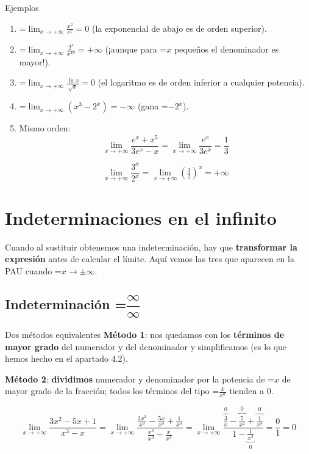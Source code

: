 \documentclass[11pt,a4paper]{article}
\newcommand{\fmm}[1]{\setbox0=\hbox{$#1$}\ifdim\wd0>\linewidth\[#1\]\else\mbox{\box0}\fi}
\begin{document}
  
\begin{fmex}{Ejemplos}
\begin{enumerate}[label=\textbf{\arabic*.},leftmargin=*]
\item \fmm{\displaystyle\lim_{x\to+\infty}\frac{x^2}{e^x}=0} (la exponencial de abajo es de orden superior).
\item \fmm{\displaystyle\lim_{x\to+\infty}\frac{2^x}{x^{10}}=+\infty} (¡aunque para \fmm{x} pequeños el denominador es mayor!).
\item \fmm{\displaystyle\lim_{x\to+\infty}\frac{\ln x}{\sqrt x}=0} (el logaritmo es de orden inferior a cualquier potencia).
\item \fmm{\displaystyle\lim_{x\to+\infty}\left(x^3-2^x\right)=-\infty} (gana \fmm{-2^x}).
\item Mismo orden: 
\[\lim_{x\to+\infty}\frac{e^x+x^5}{3e^x-x}=\lim_{x\to+\infty}\frac{e^x}{3e^x}=\frac13\]

\[\lim_{x\to+\infty}\frac{3^x}{2^x}=\lim_{x\to+\infty}\left(\tfrac32\right)^x=+\infty\]

\end{enumerate}
\end{fmex}

  
\section{Indeterminaciones en el infinito}\hypertarget{sec4}{}

  
  

Cuando al sustituir obtenemos una indeterminación, hay que \textbf{transformar la expresión} antes de calcular el límite. Aquí vemos las tres que aparecen en la PAU cuando \fmm{x\to\pm\infty}.

  
\subsection*{Indeterminación \fmm{\dfrac{\infty}{\infty}}}

  
\begin{fmdef}{Dos métodos equivalentes}
\textbf{Método 1}: nos quedamos con los \textbf{términos de mayor grado} del numerador y del denominador y simplificamos (es lo que hemos hecho en el apartado 4.2).

      

\textbf{Método 2}: \textbf{dividimos} numerador y denominador por la potencia de \fmm{x} de mayor grado de la fracción; todos los términos del tipo \fmm{\frac{k}{x^n}} tienden a 0.

      
\[\lim_{x\to+\infty}\frac{3x^2-5x+1}{x^3-x}=\lim_{x\to+\infty}\frac{\frac{3x^2}{x^3}-\frac{5x}{x^3}+\frac{1}{x^3}}{\frac{x^3}{x^3}-\frac{x}{x^3}}=\lim_{x\to+\infty}\frac{\overbrace{\tfrac{3}{x}}^{0}-\overbrace{\tfrac{5}{x^2}}^{0}+\overbrace{\tfrac{1}{x^3}}^{0}}{1-\underbrace{\tfrac{1}{x^2}}_{0}}=\frac01=0\]

\end{fmdef}
\end{document}

